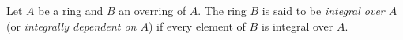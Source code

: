Let $A$ be a ring and $B$ an overring of $A$. The ring $B$ is said to be \emph{integral over $A$} (or \emph{integrally dependent on $A$}) if every element of $B$ is integral over $A$.
